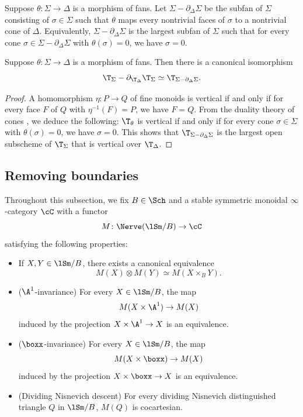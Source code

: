 \documentclass[10pt]{amsart}
\begin{document}
\begin{df}
\label{vert.11}
Suppose $\theta\colon \Sigma\to \Delta$ is a morphism of fans.
Let $\Sigma-\partial_{\Delta}\Sigma$ be the subfan of $\Sigma$ consisting of $\sigma\in \Sigma$ such that $\theta$ maps every nontrivial faces of $\sigma$ to a nontrivial cone of $\Delta$.
Equivalently, $\Sigma-\partial_{\Delta}\Sigma$ is the largest subfan of $\Sigma$ such that for every cone $\sigma\in \Sigma-\partial_{\Delta}\Sigma$ with $\theta(\sigma)=0$, we have $\sigma=0$.
\end{df}

\begin{prop}
Suppose $\theta\colon \Sigma\to \Delta$ is a morphism of fans.
Then there is a canonical isomorphism
\[
\T_\Sigma-\partial_{\T_\Delta}\T_\Sigma
\simeq
\T_{\Sigma-\partial_\Delta \Sigma}.
\]
\end{prop}
\begin{proof}
A homomorphism $\eta\colon P\to Q$ of fine monoids is vertical if and only if for every face $F$ of $Q$ with $\eta^{-1}(F)=P$, we have $F=Q$.
From the duality theory of cones \cite[Theorem I.2.3.12(4)]{Ogu}, we deduce the following:
$\T_\theta$ is vertical if and only if for every cone $\sigma\in \Sigma$ with $\theta(\sigma)=0$, we have $\sigma=0$.
This shows that $\T_{\Sigma-\partial_{\Delta}\Sigma}$ is the largest open subscheme of $\T_{\Sigma}$ that is vertical over $\T_\Delta$.
\end{proof}

\subsection{Removing boundaries}
\label{removing}

Throughout this subsection, we fix $B\in \Sch$ and a stable symmetric monoidal $\infty$-category $\cC$ with a functor
\[
M
\colon
\Nerve(\lSm/B) \to \cC
\]
satisfying the following properties:
\begin{itemize}
\item If $X,Y\in \lSm/B$, there exists a canonical equivalence
\[
M(X)\otimes M(Y)
\simeq
M(X\times_B Y).
\]
\item ($\A^1$-invariance) For every $X\in \lSm/B$, the map
\[
M(X\times \A^1)\to M(X)
\]
induced by the projection $X\times \A^1\to X$ is an equivalence.
\item ($\boxx$-invariance) For every $X\in \lSm/B$, the map
\[
M(X\times \boxx)\to M(X)
\]
induced by the projection $X\times \boxx\to X$ is an equivalence.
\item (Dividing Nisnevich descent) For every dividing Nisnevich distinguished triangle $Q$ in $\lSm/B$, $M(Q)$ is cocartesian.
\end{itemize}
\end{document}
